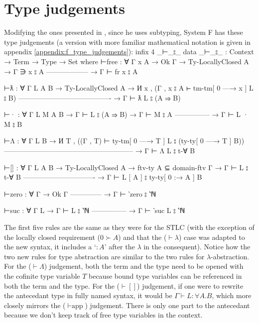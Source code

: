 \documentclass[logo,bsc,singlespacing,parskip,online]{infthesis}
\renewenvironment{code}{\mintedcopy[breaklines,breaksymbolleft=\;]{agda}}{\endmintedcopy}
\begin{document}
\section{Type judgements}
\label{chapter4:type_judgements}
Modifying the ones presented in \citet{chargueraud_locally_2012}, since he uses subtyping, System F
has these type judgements (a version with more familiar mathematical notation is given in appendix \ref{appendix:f_type_judgements}):
\begin{code}
  infix  4 _⊢_⦂_
  data _⊢_⦂_ : Context → Term → Type → Set where
    ⊢free : ∀ {Γ x A}
      → Ok Γ
      → Ty-LocallyClosed A
      → Γ ∋ x ⦂ A
        ------------------
      → Γ ⊢ fr x ⦂ A

    ⊢ƛ : ∀ {Γ L A B}
      → Ty-LocallyClosed A
      → И x , (Γ , x ⦂ A ⊢ tm-tm[ 0 —→ x ] L ⦂ B)
        ----------------------------------------
      → Γ ⊢ ƛ L ⦂ (A ⇒ B)

    ⊢· : ∀ {Γ L M A B}
      → Γ ⊢ L ⦂ (A ⇒ B)
      → Γ ⊢ M ⦂ A
        ---------------
      → Γ ⊢ L · M ⦂ B

    ⊢Λ : ∀ {Γ L B}
      → И T , ((Γ , T) ⊢ ty-tm[ 0 —→ T ] L ⦂ (ty-ty[ 0 —→ T ] B))
        --------------------------------------------------------
      → Γ ⊢ Λ L ⦂ t-∀ B

    ⊢[] : ∀ {Γ L A B}
      → Ty-LocallyClosed A
      → ftv-ty A ⊆ domain-ftv Γ
      → Γ ⊢ L ⦂ t-∀ B
        -------------------------------
      → Γ ⊢ L [ A ] ⦂ ty-ty[ 0 :→ A ] B

    ⊢zero : ∀ {Γ}
      → Ok Γ
        --------------
      → Γ ⊢ ‵zero ⦂ ‵ℕ

    ⊢suc : ∀ {Γ L}
      → Γ ⊢ L ⦂ ‵ℕ
        ---------------
      → Γ ⊢ ‵suc L ⦂ ‵ℕ
\end{code}

The first five rules are the same as they were for the STLC (with the exception of the locally
closed requirement ($0 \succ A$) and that the ($\vdash \lambda$) case was adapted to the new syntax,
it includes a `$\colon A$' after the $\lambda$ in the consequent). Notice how the two new rules for
type abstraction are similar to the two rules for $\lambda$-abstraction. For the ($\vdash\Lambda$)
judgement, both the term and the type need to be opened with the cofinite type variable $T$ because
bound type variables can be referenced in both the term and the type. For the ($\vdash[]$)
judgement, if one were to rewrite the antecedant type in fully named syntax, it would be $\Gamma
\vdash L \colon \forall A. B$, which more closely mirrors the ($\vdash\text{app}$) judgement. There
is only one part to the antecedant because we don't keep track of free type variables in the
context.
\end{document}
